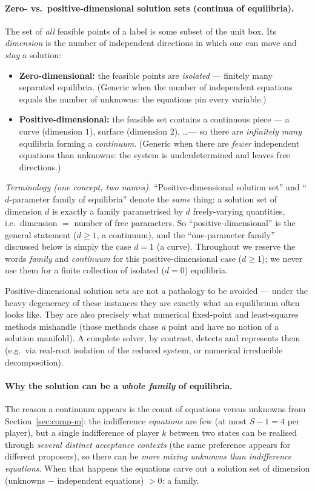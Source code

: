 \documentclass[11pt]{article}
\begin{document}
\paragraph{Zero- vs.\ positive-dimensional solution sets (continua of equilibria).}
The set of \emph{all} feasible points of a label is some subset of the unit box. Its
\emph{dimension} is the number of independent directions in which one can move and
\emph{stay} a solution:
\begin{itemize}[nosep]
\item \textbf{Zero-dimensional:} the feasible points are \emph{isolated} --- finitely
many separated equilibria. (Generic when the number of independent equations equals
the number of unknowns: the equations pin every variable.)
\item \textbf{Positive-dimensional:} the feasible set contains a continuous piece ---
a curve (dimension $1$), surface (dimension $2$), \dots --- so there are
\emph{infinitely many} equilibria forming a \emph{continuum}. (Generic when there are
\emph{fewer} independent equations than unknowns: the system is underdetermined and
leaves free directions.)
\end{itemize}

\emph{Terminology (one concept, two names).} ``Positive-dimensional solution set''
and ``$d$-parameter family of equilibria'' denote the \emph{same} thing: a solution
set of dimension $d$ is exactly a family parametrised by $d$ freely-varying
quantities, i.e.\ dimension $=$ number of free parameters. So ``positive-dimensional''
is the general statement ($d\geq1$, a continuum), and the ``one-parameter family''
discussed below is simply the case $d=1$ (a curve). Throughout we reserve the words
\emph{family} and \emph{continuum} for this positive-dimensional case ($d\geq1$);
we never use them for a finite collection of isolated ($d=0$) equilibria.

Positive-dimensional solution sets are not a pathology to be avoided --- under the
heavy degeneracy of these instances they are exactly what an equilibrium often looks
like. They are also precisely what numerical fixed-point and least-squares methods
mishandle (those methods chase \emph{a} point and have no notion of a solution
manifold). A complete solver, by contrast, detects and represents them (e.g.\ via
real-root isolation of the reduced system, or numerical irreducible decomposition).

\paragraph{Why the solution can be a \emph{whole family} of equilibria.} The reason a
continuum appears is the count of equations versus unknowns from
Section~\ref{sec:comp-m}: the indifference \emph{equations} are few (at most $S-1=4$
per player), but a single indifference of player $k$ between two states can be
realised through \emph{several distinct acceptance contexts} (the same preference
appears for different proposers), so there can be \emph{more mixing unknowns than
indifference equations}. When that happens the equations carve out a solution set of
dimension (unknowns $-$ independent equations) $>0$: a family.
\end{document}
